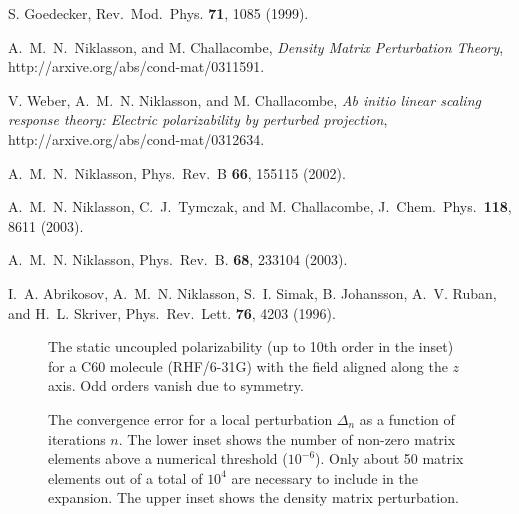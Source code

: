 \begin{references}

 S. Goedecker,
Rev.\ Mod.\ Phys. {\bf 71}, 1085 (1999).

 A.\ M.\ N.\ Niklasson, and M. Challacombe,
{\it Density Matrix Perturbation Theory},
http://arxive.org/abs/cond-mat/0311591.

 V. Weber, A.\ M.\ N. Niklasson, and M. Challacombe,
{\it Ab initio linear scaling response theory: Electric polarizability 
by perturbed projection}, http://arxive.org/abs/cond-mat/0312634.

 A.\ M.\ N.\ Niklasson, 
Phys.\ Rev.\ B {\bf 66}, 155115 (2002). 

 A.\ M.\ N. Niklasson, C.\ J.\ Tymczak, and M. Challacombe,
J.\ Chem.\ Phys.\ {\bf 118}, 8611 (2003).

 A.\ M.\ N. Niklasson,
Phys.\ Rev.\ B. {\bf 68}, 233104 (2003).

 I.\ A. Abrikosov, A.\ M.\ N. Niklasson, S.\ I. Simak,
B. Johansson, A.\ V. Ruban, and H.\ L. Skriver,
Phys.\ Rev.\ Lett. {\bf 76}, 4203 (1996).

\end{references}

\begin{figure}
\caption{\small  The static uncoupled polarizability (up to 10th order in the inset)
for a C60 molecule (RHF/6-31G) with the field aligned along the $z$ axis. 
Odd orders vanish due to symmetry.
\label{Fig1}}
\end{figure}


\begin{figure}
\caption{\small The convergence error for a local perturbation $\Delta_n$ as a function 
of iterations $n$.  The lower inset shows the number of non-zero matrix elements 
above a numerical threshold ($10^{-6}$). Only about 50 matrix elements out of a 
total of $10^4$ are necessary to include in the expansion. The upper inset shows 
the density matrix perturbation.
\label{Fig2}}
\end{figure}


